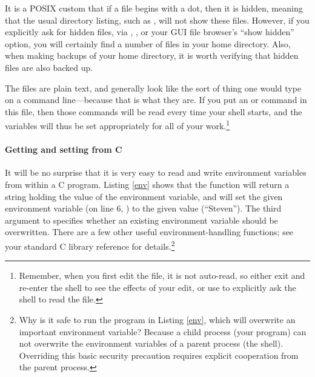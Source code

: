   
It is a POSIX
custom that if a file begins with a dot, then it is hidden, meaning that the usual
directory listing, such as , will not show these files. However,
if you explicitly ask for hidden files, via , , or your GUI
file browser's ``show hidden'' option, you will certainly find a number
of  files in your home directory. Also, when making backups of
your home directory, it is worth verifying that hidden files are also
backed up.

The  files are plain text, and generally look like the sort of
thing one would type on a command line---because that is what they are.
If you put an  or  command in this file, then 
those commands will be read every time your shell starts, and the
variables will thus be set appropriately for all of your
work.\footnote{Remember, when you first edit the file, it is not auto-read, so either exit and
re-enter the shell to see the effects of your edit, or use  to explicitly ask the shell to read the file.}

\paragraph{\treesymbol Getting and setting from C}
It will be no surprise that it is very easy to read and write 
environment variables from within a C program. Listing \ref{env}
shows that the  function will return a string holding the value of the
environment variable, and  will set the given environment
variable (on line 6, ) to the given value (``Steven''). The third
argument to  specifies whether an existing environment variable
should be overwritten. There are a few other useful environment-handling
functions; see your standard C library reference for details.\footnote{Why
is it safe to run the program in Listing \ref{env}, which will overwrite
an important environment variable? Because a child process (your program)
can not overwrite the  environment variables of a parent process (the
shell). Overriding this basic security precaution requires explicit
cooperation from the parent process.}

\lstset{numbers=left, numberstyle=\scshape}
\lstset{numbers=none}


